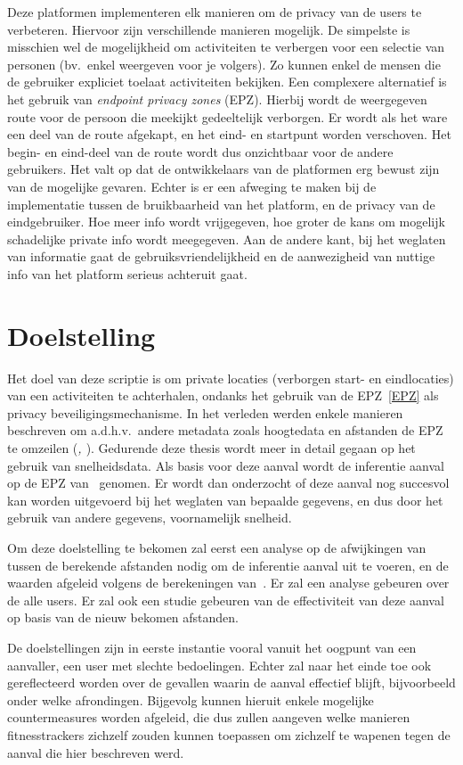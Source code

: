 Deze platformen implementeren elk manieren om de privacy van de users te
verbeteren. Hiervoor zijn verschillende manieren mogelijk. De simpelste is
misschien wel de mogelijkheid om activiteiten te verbergen voor een selectie
van personen (bv.\ enkel weergeven voor je volgers). Zo kunnen enkel de mensen
die de gebruiker expliciet toelaat activiteiten bekijken. Een complexere
alternatief is het gebruik van \textit{endpoint privacy zones} (EPZ). Hierbij
wordt de weergegeven route voor de persoon die meekijkt gedeeltelijk verborgen.
Er wordt als het ware een deel van de route afgekapt, en het eind- en startpunt
worden verschoven. Het begin- en eind-deel van de route wordt dus onzichtbaar
voor de andere gebruikers. Het valt op dat de ontwikkelaars van de platformen
erg bewust zijn van de mogelijke gevaren. Echter is er een afweging te maken
bij de implementatie tussen de bruikbaarheid van het platform, en de privacy
van de eindgebruiker. Hoe meer info wordt vrijgegeven, hoe groter de kans om
mogelijk schadelijke private info wordt meegegeven. Aan de andere kant, bij het
weglaten van informatie gaat de gebruiksvriendelijkheid en de aanwezigheid van
nuttige info van het platform serieus achteruit gaat.

\section{Doelstelling}
Het doel van deze scriptie is om private locaties (verborgen start- en
eindlocaties) van een activiteiten te achterhalen, ondanks het gebruik van de
EPZ~\ref{EPZ} als privacy beveiligingsmechanisme. In het verleden werden enkele
manieren beschreven om a.d.h.v.\ andere metadata zoals hoogtedata en afstanden
de EPZ te omzeilen
(\textit{\citeauthor{Dhondt_Pochat_Voulimeneas_Joosen_Volckaert_2022},
    \citeauthor{Verdonck_2022}}). Gedurende deze thesis wordt meer in detail gegaan
op het gebruik van snelheidsdata. Als basis voor deze aanval wordt de
inferentie aanval op de EPZ
van~\citeauthor{Dhondt_Pochat_Voulimeneas_Joosen_Volckaert_2022} genomen. Er
wordt dan onderzocht of deze aanval nog succesvol kan worden uitgevoerd bij het
weglaten van bepaalde gegevens, en dus door het gebruik van andere gegevens,
voornamelijk snelheid.

Om deze doelstelling te bekomen zal eerst een analyse op de afwijkingen van
tussen de berekende afstanden nodig om de inferentie aanval uit te voeren, en
de waarden afgeleid volgens de berekeningen
van~\citeauthor{Dhondt_Pochat_Voulimeneas_Joosen_Volckaert_2022}. Er zal een
analyse gebeuren over de alle users. Er zal ook een studie gebeuren van de
effectiviteit van deze aanval op basis van de nieuw bekomen afstanden.

De doelstellingen zijn in eerste instantie vooral vanuit het oogpunt van een
aanvaller, een user met slechte bedoelingen. Echter zal naar het einde toe ook
gereflecteerd worden over de gevallen waarin de aanval effectief blijft,
bijvoorbeeld onder welke afrondingen. Bijgevolg kunnen hieruit enkele mogelijke
countermeasures worden afgeleid, die dus zullen aangeven welke manieren
fitnesstrackers zichzelf zouden kunnen toepassen om zichzelf te wapenen tegen
de aanval die hier beschreven werd.